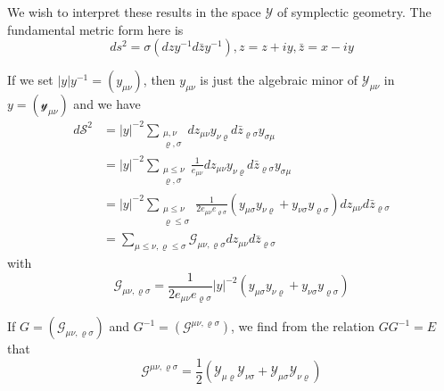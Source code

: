  We wish to interpret these results in the space $\mathscr{Y}$ of
 symplectic geometry. The fundamental metric form here is  
 $$
 d s^2 = \sigma (d z y^{-1} d \bar{z} y^{-1}), z = z + i y,
 \bar {z} = x - iy  
 $$
 
 If we set $|y| y^{-1} = (y_{\mu \nu })$, then $y_{\mu \nu}$ is just
 the algebraic minor of $\mathcal{Y}_{\mu \nu }$ in $y =
 (\mathcal{y}_{\mu \nu })$ and we have  
 \begin{align*}
d \mathscr{S}^2 & = |y|^{-2} \sum_{\substack{\mu, \nu \\ \varrho,
    \sigma }} dz_{\mu \nu} y_{\nu \varrho } d \bar {z}_{\varrho \sigma
} y_{\sigma \mu}\\ 
& = |y|^{-2} \sum_{\substack{\mu \leq  \nu \\ \varrho, \sigma }}
\frac{1}{e_{\mu \nu }}dz_{\mu \nu} y_{\nu \varrho } d \bar
     {z}_{\varrho \sigma } y_{\sigma \mu}\\ 
& = |y|^{-2} \sum_{\substack{\mu \leq  \nu \\ \varrho \leq  \sigma }}
     \frac{1}{2e_{\mu \nu } e_{\varrho \sigma }}(y_{\mu \sigma }
     y_{\nu \varrho } + y_{\nu \sigma } y_{\varrho \sigma })dz_{\mu
       \nu}  d \bar {z}_{\varrho \sigma } \\ 
& = \sum_{\mu \leq  \nu, \varrho \leq  \sigma } \mathcal{G}_{\mu
       \nu, \varrho  \sigma} dz_{\mu \nu}  d \bar {z}_{\varrho \sigma
     }  \tag{323}\label{eq323}  
 \end{align*} 
 with 
 \begin{equation*}
\mathcal{G}_{\mu   \nu, \varrho  \sigma} = \frac{1}{2e_{\mu \nu }
  e_{\varrho \sigma }} |y|^{-2} (y_{\mu \sigma } y_{\nu \varrho } +
y_{\nu \sigma } y_{\varrho \sigma }) \tag{324}\label{eq324}  
 \end{equation*} 
 
 If $G = (\mathcal{G}_{\mu \nu, \varrho \sigma })$ and $G^{-1} =
 (\mathcal{G}^{\mu \nu, \varrho \sigma })$, we find from the relation
 $G G^{-1} = E$ that  
 \begin{equation*}
\mathcal{G}^{\mu \nu, \varrho \sigma } = \frac{1}{2} (\mathcal{Y}_{\mu
  \varrho} \mathcal{Y}_{\nu \sigma} + \mathcal{Y}_{\mu \sigma}
\mathcal{Y}_{\nu \varrho}) \tag{325}\label{eq325}  
 \end{equation*}\pageoriginale 
 
